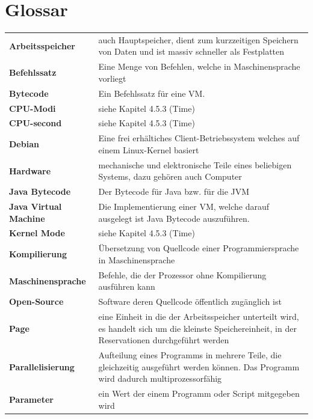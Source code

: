 \documentclass{fancydocument}
\begin{document}
\section{Glossar}
\renewcommand{\arraystretch}{1.4}
\begin{tabularx}{\linewidth}{p{6.5cm}X}
\textbf{Arbeitsspeicher}&auch Hauptspeicher, dient zum kurzzeitigen Speichern von Daten und ist massiv schneller als Festplatten\\
\textbf{Befehlssatz}&Eine Menge von Befehlen, welche in Maschinensprache vorliegt\\
\textbf{Bytecode}&Ein Befehlssatz für eine VM.\\
\textbf{CPU-Modi}&siehe Kapitel 4.5.3 (Time)\\
\textbf{CPU-second}&siehe Kapitel 4.5.3 (Time)\\
\textbf{Debian}&Eine frei erhältiches Client-Betriebssystem welches auf einem Linux-Kernel basiert\\
\textbf{Hardware}&mechanische und elektronische Teile eines beliebigen Systems, dazu gehören auch Computer\\
\textbf{Java Bytecode}&Der Bytecode für Java bzw. für die JVM\\
\textbf{Java Virtual Machine}&Die Implementierung einer VM, welche darauf ausgelegt ist Java Bytecode auszuführen.\\
\textbf{Kernel Mode}&siehe Kapitel 4.5.3 (Time)\\
\textbf{Kompilierung}&Übersetzung von Quellcode einer Programmiersprache in Maschinensprache\\
\textbf{Maschinensprache}&Befehle, die der Prozessor ohne Kompilierung ausführen kann\\
\textbf{Open-Source}&Software deren Quellcode öffentlich zugänglich ist\\
\textbf{Page}&eine Einheit in die der Arbeitsspeicher unterteilt wird, es handelt sich um die kleinste Speichereinheit, in der Reservationen durchgeführt werden\\
\textbf{Parallelisierung}&Aufteilung eines Programms in mehrere Teile, die gleichzeitig ausgeführt werden können. Das Programm wird dadurch multiprozessorfähig\\
\textbf{Parameter}&ein Wert der einem Programm oder Script mitgegeben wird\\
\end{tabularx}
\newpage
\noindent
\end{document}
